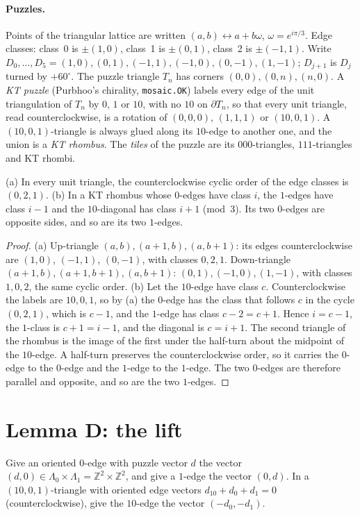 \documentclass[11pt]{article}
\theoremstyle{definition}\newtheorem{definition}[theorem]{Definition}\newtheorem{remark}[theorem]{Remark}
\newcommand{\Z}{\mathbb Z}\newcommand{\R}{\mathbb R}
\begin{document}
\paragraph{Puzzles.} Points of the triangular lattice are written $(a,b)\leftrightarrow a+b\omega$, $\omega=e^{i\pi/3}$. Edge classes: class~0 is $\pm(1,0)$, class~1 is $\pm(0,1)$, class~2 is $\pm(-1,1)$. Write $D_0,\dots,D_5=(1,0),(0,1),(-1,1),(-1,0),(0,-1),(1,-1)$; $D_{j+1}$ is $D_j$ turned by $+60^\circ$. The puzzle triangle $T_n$ has corners $(0,0),(0,n),(n,0)$. A \emph{KT puzzle} (Purbhoo's chirality, \texttt{mosaic.OK}) labels every edge of the unit triangulation of $T_n$ by $0$, $1$ or $10$, with no $10$ on $\partial T_n$, so that every unit triangle, read counterclockwise, is a rotation of $(0,0,0)$, $(1,1,1)$ or $(10,0,1)$. A $(10,0,1)$-triangle is always glued along its $10$-edge to another one, and the union is a \emph{KT rhombus}. The \emph{tiles} of the puzzle are its $000$-triangles, $111$-triangles and KT rhombi.

\begin{lemma}\label{lem:chir}
(a) In every unit triangle, the counterclockwise cyclic order of the edge classes is $(0,2,1)$.
(b) In a KT rhombus whose $0$-edges have class $i$, the $1$-edges have class $i-1$ and the $10$-diagonal has class $i+1$ (mod~3). Its two $0$-edges are opposite sides, and so are its two $1$-edges.
\end{lemma}
\begin{proof}
(a) Up-triangle $(a,b),(a+1,b),(a,b+1)$: its edges counterclockwise are $(1,0)$, $(-1,1)$, $(0,-1)$, with classes $0,2,1$. Down-triangle $(a+1,b),(a+1,b+1),(a,b+1)$: $(0,1),(-1,0),(1,-1)$, with classes $1,0,2$, the same cyclic order.
(b) Let the $10$-edge have class $c$. Counterclockwise the labels are $10,0,1$, so by (a) the $0$-edge has the class that follows $c$ in the cycle $(0,2,1)$, which is $c-1$, and the $1$-edge has class $c-2=c+1$. Hence $i=c-1$, the $1$-class is $c+1=i-1$, and the diagonal is $c=i+1$. The second triangle of the rhombus is the image of the first under the half-turn about the midpoint of the $10$-edge. A half-turn preserves the counterclockwise order, so it carries the $0$-edge to the $0$-edge and the $1$-edge to the $1$-edge. The two $0$-edges are therefore parallel and opposite, and so are the two $1$-edges.
\end{proof}

\section{Lemma D: the lift}\label{sec:D}
Give an oriented $0$-edge with puzzle vector $d$ the vector $(d,0)\in\Lambda_0\times\Lambda_1=\Z^2\times\Z^2$, and give a $1$-edge the vector $(0,d)$. In a $(10,0,1)$-triangle with oriented edge vectors $d_{10}+d_0+d_1=0$ (counterclockwise), give the $10$-edge the vector $(-d_0,-d_1)$.
\end{document}
